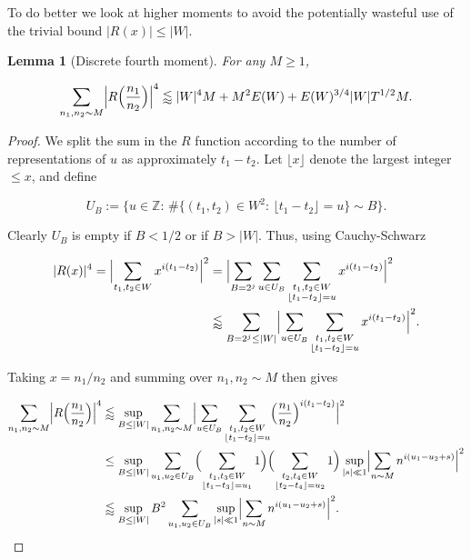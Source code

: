 \documentclass{amsart}
\theoremstyle{plain}
\newtheorem{lmm}[thrm]{Lemma}
\numberwithin{equation}{section}
\begin{document}
To do better we look at higher moments to avoid the potentially wasteful use of the trivial bound $|R(x)|\le |W|$.

%
%


\begin{lmm}[Discrete fourth moment] \label{lmm:R4bound} For any $M \ge 1$, 

\[ \sum_{n_1,n_2\sim M}\Bigl|R\Bigl(\frac{n_1}{n_2}\Bigr)\Bigr|^4  \lessapprox  |W|^4 M + M^2 E(W) +  E(W)^{3/4}|W|T^{1/2}M.\]

\end{lmm}

\begin{proof} We split the sum in the $R$ function according to the number of representations of $u$ as approximately $t_1-t_2$. Let $\lfloor x \rfloor$ denote the largest integer $\le x$, and define

\[
U_B:=\Big\{u\in \mathbb{Z}:\, \# \{(t_1,t_2)\in W^2:\,\lfloor t_1-t_2\rfloor=u\} \sim B \Big\}.
\]

Clearly $U_B$ is empty if $B<1/2$ or if $B>|W|$. Thus, using Cauchy-Schwarz

\begin{align*}
|R(x)|^4=\Bigl|\sum_{t_1,t_2\in W}x^{i(t_1-t_2)}\Bigr|^2&=\Bigl|\sum_{B=2^j}\sum_{u\in U_B}\sum_{\substack{t_1,t_2\in W\\ \lfloor t_1-t_2\rfloor=u}}x^{i(t_1-t_2)}\Bigr|^2\\
&\lessapprox \sum_{B=2^j\le |W|}\Bigl|\sum_{u\in U_B}\sum_{\substack{t_1,t_2\in W\\ \lfloor t_1-t_2\rfloor=u}}x^{i(t_1-t_2)}\Bigr|^2.
\end{align*}

Taking $x=n_1/n_2$ and summing over $n_1,n_2\sim M$ then gives

\begin{align*}
\sum_{n_1,n_2\sim M}\Bigr|R\Bigl(\frac{n_1}{n_2}\Bigr)\Bigr|^4&\lessapprox \sup_{B\le |W|}\sum_{n_1,n_2\sim M}\Bigl|\sum_{u\in U_B}\sum_{\substack{t_1,t_2\in W\\ \lfloor t_1-t_2\rfloor=u}}\Bigl(\frac{n_1}{n_2}\Bigr)^{i(t_1-t_2)}\Bigr|^2\\
&\le\sup_{B\le |W|}\sum_{u_1,u_2\in U_B}\Bigl(\sum_{\substack{t_1,t_3\in W\\ \lfloor t_1-t_3\rfloor=u_1}}1\Bigr)\Bigl(\sum_{\substack{t_2,t_4\in W\\ \lfloor t_2-t_4\rfloor=u_2}}1\Bigr)\sup_{|s| \ll 1}\Bigl|\sum_{n\sim M}n^{i(u_1-u_2+s)}\Bigr|^2\\
&\lessapprox \sup_{B\le |W|}B^2\sum_{u_1,u_2\in U_B} \sup_{|s| \ll 1} \Bigl|\sum_{n\sim M}n^{i(u_1-u_2+s)}\Bigr|^2.
\end{align*}


\end{proof}
\end{document}
